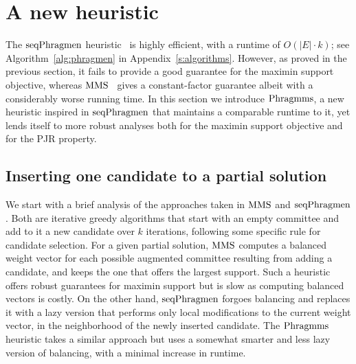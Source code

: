\section{A new heuristic}\label{s:heuristic}

The $\operatorname{seqPhragmen}$ heuristic~\cite{brill2017phragmen} is highly efficient, with a runtime of $O(|E|\cdot k)$; see Algorithm~\ref{alg:phragmen} in Appendix~\ref{s:algorithms}. 
However, as proved in the previous section, it fails to provide a good guarantee for the maximin support objective, whereas $\operatorname{MMS}$~\cite{sanchez2016maximin} gives a constant-factor guarantee albeit with a considerably worse running time.
In this section we introduce $\operatorname{Phragmms}$, a new heuristic inspired in $\operatorname{seqPhragmen}$ that maintains a comparable runtime to it, yet lends itself to more robust analyses both for the maximin support objective and for the PJR property. 

\subsection{Inserting one candidate to a partial solution}\label{s:inserting}

We start with a brief analysis of the approaches taken in $\operatorname{MMS}$ and $\operatorname{seqPhragmen}$. 
Both are iterative greedy algorithms that start with an empty committee and add to it a new candidate over $k$ iterations, following some specific rule for candidate selection.
For a given partial solution, $\operatorname{MMS}$ computes a balanced weight vector for each possible augmented committee resulting from adding a candidate, and keeps the one that offers the largest support. 
Such a heuristic offers robust guarantees for maximin support but is slow as computing balanced vectors is costly. 
On the other hand, $\operatorname{seqPhragmen}$ forgoes balancing and replaces it with a lazy version that performs only local modifications to the current weight vector, in the neighborhood of the newly inserted candidate. 
The $\operatorname{Phragmms}$ heuristic takes a similar approach but uses a somewhat smarter and less lazy version of balancing, with a minimal increase in runtime. 

